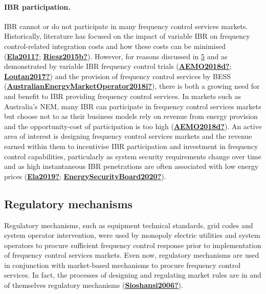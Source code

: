 \documentclass[12pt,a4paper,]{report}
\begin{document}
\hypertarget{ibr-participation.}{%
\paragraph{IBR participation.}\label{ibr-participation.}}

IBR cannot or do not participate in many frequency control services
markets. Historically, literature has focused on the impact of variable
IBR on frequency control-related integration costs and how these costs
can be minimised (\protect\hyperlink{ref-Ela2011}{\textbf{Ela2011?}};
\protect\hyperlink{ref-Riesz2015b}{\textbf{Riesz2015b?}}). However, for
reasons discussed in \protect\hyperlink{sec:ibr_freq}{5} and as
demonstrated by variable IBR frequency control trials
(\protect\hyperlink{ref-AEMO2018d}{\textbf{AEMO2018d?}};
\protect\hyperlink{ref-Loutan2017}{\textbf{Loutan2017?}}) and the
provision of frequency control services by BESS
(\protect\hyperlink{ref-AustralianEnergyMarketOperator2018i}{\textbf{AustralianEnergyMarketOperator2018i?}}),
there is both a growing need for and benefit to IBR providing frequency
control services. In markets such as Australia's NEM, many IBR can
participate in frequency control services markets but choose not to as
their business models rely on revenue from energy provision and the
opportunity-cost of participation is too high
(\protect\hyperlink{ref-AEMO2018d}{\textbf{AEMO2018d?}}). An active area
of interest is designing frequency control services markets and the
revenue earned within them to incentivise IBR participation and
investment in frequency control capabilities, particularly as system
security requirements change over time and as high instantaneous IBR
penetrations are often associated with low energy prices
(\protect\hyperlink{ref-Ela2019}{\textbf{Ela2019?}};
\protect\hyperlink{ref-EnergySecurityBoard2020}{\textbf{EnergySecurityBoard2020?}}).

\hypertarget{sec:regulatory_mech}{%
\subsection{Regulatory mechanisms}\label{sec:regulatory_mech}}

Regulatory mechanisms, such as equipment technical standards, grid codes
and system operator intervention, were used by monopoly electric
utilities and system operators to procure sufficient frequency control
response prior to implementation of frequency control services markets.
Even now, regulatory mechanisms are used in conjunction with
market-based mechanisms to procure frequency control services. In fact,
the processes of designing and regulating market rules are in and of
themselves regulatory mechanisms
(\protect\hyperlink{ref-Sioshansi2006}{\textbf{Sioshansi2006?}}).
\end{document}
